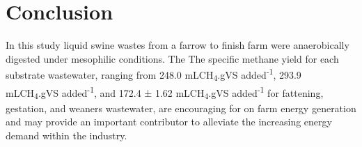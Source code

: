 \section{Conclusion}
In this study liquid swine wastes from a farrow to finish farm were anaerobically digested under mesophilic conditions. The The specific methane yield for each substrate wastewater, ranging from 248.0 mLCH\textsubscript{4}.gVS added\textsuperscript{-1}, 293.9 mLCH\textsubscript{4}.gVS added\textsuperscript{-1}, and 172.4 ± 1.62 mLCH\textsubscript{4}.gVS added\textsuperscript{-1} for fattening, gestation, and weaners wastewater, are encouraging for on farm energy generation and may provide an important contributor to alleviate the increasing energy demand within the industry.